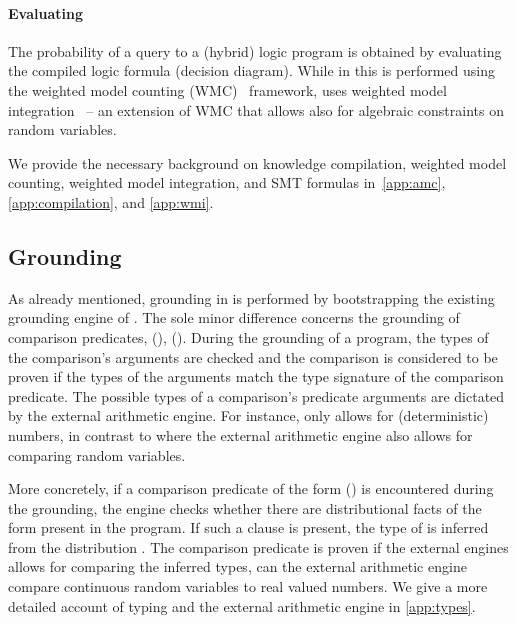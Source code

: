 \paragraph{\bf Evaluating} The probability of a query to a (hybrid) logic program is obtained by evaluating the compiled logic formula (decision diagram). While in \problogsys this is performed using the weighted model counting (WMC)~\citep{chavira2008probabilistic} framework, \dcproblogsys uses weighted model integration~\citep{belle2015probabilistic} -- an extension of WMC that allows also for algebraic constraints on random variables.

\bigbreak

We provide the necessary background on knowledge compilation, weighted model counting, weighted model integration, and SMT formulas in~\ref{app:amc}, \ref{app:compilation}, and
\ref{app:wmi}.


\subsection{Grounding}
As already mentioned, grounding in \dcproblogsys is performed by bootstrapping the existing grounding engine of \problogsys. The sole minor difference concerns the grounding of comparison predicates, \eg (), ().
During the grounding of a \dcproblogsty program, the types of the comparison's arguments are checked and the comparison is considered to be proven if the types of the arguments match the type signature of the comparison predicate.
The possible types of a comparison's predicate arguments are dictated by the external arithmetic engine. For instance, \prologsty only allows for (deterministic) numbers, in contrast to \dcproblogsty where the external arithmetic engine also allows for comparing random variables.

More concretely, if a comparison predicate of the form () is encountered during the grounding, the engine checks whether there are distributional facts of the form  present in the program. If such a clause is present, the type of  is inferred from the distribution . The comparison predicate is proven if the external engines allows for comparing the inferred types, \eg can the external arithmetic engine compare continuous random variables to real valued numbers. We give a more detailed account of typing and the external arithmetic engine in \ref{app:types}.


